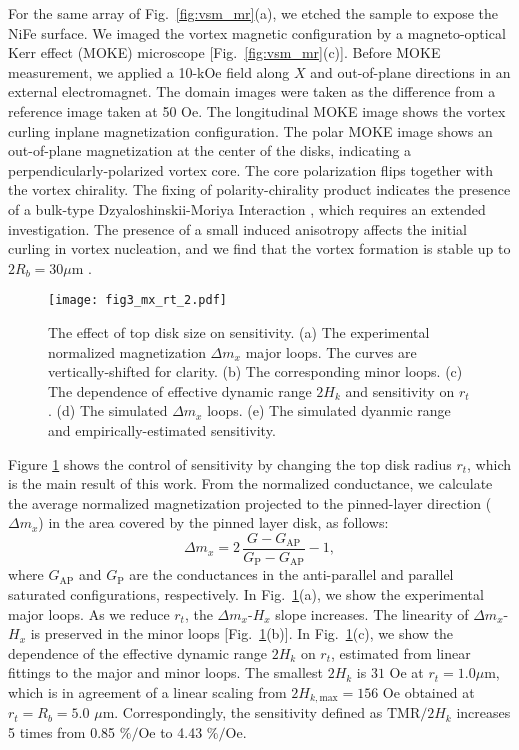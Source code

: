 \documentclass[10pt]{iopart}
\begin{document}
    For the same array of Fig.~\ref{fig:vsm_mr}(a), we etched the sample to expose the NiFe surface. We imaged the vortex magnetic configuration by a magneto-optical Kerr effect (MOKE) microscope [Fig.~\ref{fig:vsm_mr}(c)]. Before MOKE measurement, we applied a 10-kOe field along $X$ and out-of-plane directions in an external electromagnet. The domain images were taken as the difference from a reference image taken at 50 Oe. The longitudinal MOKE image shows the vortex curling inplane magnetization configuration. The polar MOKE image shows an out-of-plane magnetization at the center of the disks, indicating a perpendicularly-polarized vortex core. {The core polarization flips together with the vortex chirality. The fixing of polarity-chirality product indicates the presence of a bulk-type Dzyaloshinskii-Moriya Interaction \cite{im_2012}, which requires an extended investigation.} The presence of a small induced anisotropy affects the initial curling in vortex nucleation, and we find that the vortex formation is stable up to $2R_b = 30 \mu$m \cite{NoteSupp}.
    
    
    \begin{figure}
        \texttt{[image: fig3\_mx\_rt\_2.pdf]}
        \caption{The effect of top disk size on sensitivity. (a) The experimental normalized magnetization $\Delta m_x$ major loops. The curves are vertically-shifted for clarity. (b) The corresponding minor loops. (c) The dependence of effective dynamic range $2 H_k$ and sensitivity on $r_t$. (d) The simulated $\Delta m_x$ loops. (e) The simulated dyanmic range and empirically-estimated sensitivity. }
        \label{fig:rt}
    \end{figure}
    
    Figure \ref{fig:rt} shows the control of sensitivity by changing the top disk radius $r_t$, which is the main result of this work. From the normalized conductance, we calculate the average normalized magnetization projected to the pinned-layer direction ($\Delta m_x$) in the area covered by the pinned layer disk, as follows:
    \begin{equation}
        \Delta m_x = 2 \, \frac{G - G_\mathrm{AP}}{G_\mathrm{P} - G_\mathrm{AP}} - 1,
    \end{equation}
    where $G_\mathrm{AP}$ and $G_\mathrm{P}$ are the conductances in the anti-parallel and parallel saturated configurations, respectively. In Fig.~\ref{fig:rt}(a), we show the experimental major loops. As we reduce $r_t$, the $\Delta m_x$-$H_x$ slope increases. The linearity of $\Delta m_x$-$H_x$ is preserved in the minor loops [Fig.~\ref{fig:rt}(b)]. In Fig.~\ref{fig:rt}(c), we show the dependence of the effective dynamic range $2H_k$ on $r_t$, estimated from linear fittings to the major and minor loops.
    The smallest $2H_k$ is $31$ Oe at $r_t = 1.0 \mu$m, which is in agreement of a linear scaling from $2H_{k, \mathrm{max}} = 156$ Oe obtained at $r_t = R_b = 5.0$ $\mu$m. Correspondingly, the sensitivity defined as $\mathrm{TMR}/2H_k$ increases 5 times from 0.85 $\%/\mathrm{Oe}$ to 4.43 $\%/\mathrm{Oe}$.
    
\end{document}
